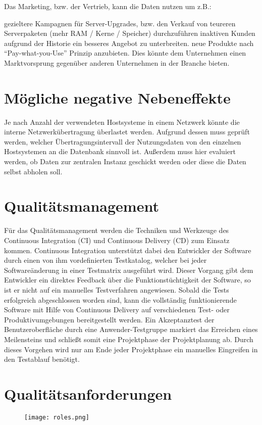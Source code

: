 Das Marketing, bzw. der Vertrieb, kann die Daten nutzen um z.B.:
\begin{outline}
  \1 gezieltere Kampagnen für Server-Upgrades, bzw. den Verkauf von teureren
  Serverpaketen (mehr RAM / Kerne / Speicher) durchzuführen
  \1 inaktiven Kunden aufgrund der Historie ein besseres Angebot zu
  unterbreiten.
  \1 neue Produkte nach “Pay-what-you-Use” Prinzip anzubieten. Dies könnte dem
  Unternehmen einen Marktvorsprung gegenüber anderen Unternehmen in der
  Branche bieten.
\end{outline}

\section{Mögliche negative Nebeneffekte}

Je nach Anzahl der verwendeten Hostsysteme in einem Netzwerk könnte die interne
Netzwerkübertragung überlastet werden. Aufgrund dessen muss geprüft werden,
welcher Übertragungsintervall der Nutzungsdaten von den einzelnen Hostsystemen
an die Datenbank sinnvoll ist. Außerdem muss hier evaluiert werden, ob Daten
zur zentralen Instanz geschickt werden oder diese die Daten selbst abholen
soll.

\section{Qualitätsmanagement}
Für das Qualitätsmanagement werden die Techniken und Werkzeuge des Continuous
Integration (CI) und Continuous Delivery (CD) zum Einsatz kommen. Continuous
Integration unterstützt dabei den Entwickler der Software durch einen von ihm
vordefinierten Testkatalog, welcher bei jeder Softwareänderung in einer
Testmatrix ausgeführt wird. Dieser Vorgang gibt dem Entwickler ein direktes
Feedback über die Funktionstüchtigkeit der Software, so ist er nicht auf ein
manuelles Testverfahren angewiesen. Sobald die Tests erfolgreich abgeschlossen
worden sind, kann die vollständig funktionierende Software mit Hilfe von
Continuous Delivery auf verschiedenen Test- oder Produktivumgebungen
bereitgestellt werden. Ein Akzeptanztest der Benutzeroberfläche durch eine
Anwender-Testgruppe markiert das Erreichen eines Meilensteins und schließt
somit eine Projektphase der Projektplanung ab. Durch dieses Vorgehen wird nur
am Ende jeder Projektphase ein manuelles Eingreifen in den Testablauf benötigt.

\FloatBarrier
\section{Qualitätsanforderungen}
\begin{figure}[ht]
  \centering
  \texttt{[image: roles.png]}
\end{figure}
\FloatBarrier
